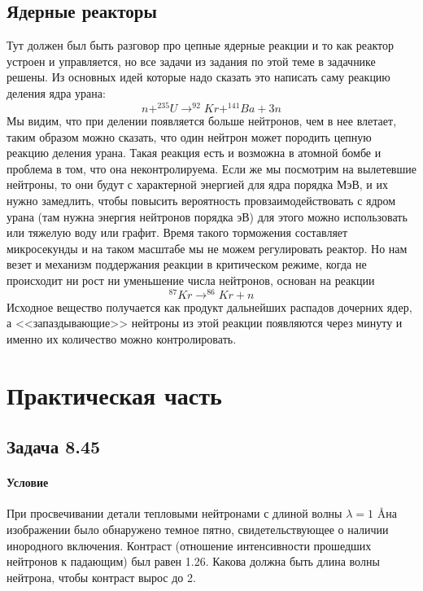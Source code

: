 \documentclass[12pt]{article}
\begin{document}
\subsection{Ядерные реакторы}
Тут должен был быть разговор про цепные ядерные реакции и то как реактор устроен и управляется, но все задачи из задания по этой теме в задачнике решены. Из основных идей которые надо сказать это написать саму реакцию деления ядра урана:
\begin{equation*}
    n + ^{235}U \rightarrow ^{92}Kr + ^{141}Ba + 3n
\end{equation*}
Мы видим, что при делении появляется больше нейтронов, чем в нее влетает, таким образом можно сказать, что один нейтрон может породить цепную реакцию деления урана. Такая реакция есть и возможна в атомной бомбе и проблема в том, что она неконтролируема. Если же мы посмотрим на вылетевшие нейтроны, то они будут с характерной энергией для ядра порядка МэВ, и их нужно замедлить, чтобы повысить вероятность провзаимодействовать с ядром урана (там нужна энергия нейтронов порядка эВ) для этого можно использовать или тяжелую воду или графит. Время такого торможения составляет микросекунды и на таком масштабе мы не можем регулировать реактор. Но нам везет и механизм поддержания реакции в критическом режиме, когда не происходит ни рост ни уменьшение числа нейтронов, основан на реакции 
\begin{equation*}
    ^{87}Kr \rightarrow ^{86}Kr + n
\end{equation*}
Исходное вещество получается как продукт дальнейших распадов дочерних ядер, а <<запаздывающие>> нейтроны из этой реакции появляются через минуту и именно их количество можно контролировать.

\section{Практическая часть}
\subsection{Задача 8.45}
\label{task_}
\paragraph{Условие}
При просвечивании детали тепловыми нейтронами с длиной волны $\lambda = 1$ \AA на изображении было обнаружено темное пятно, свидетельствующее о наличии инородного включения. Контраст (отношение интенсивности прошедших нейтронов к падающим) был равен 1.26. Какова должна быть длина волны нейтрона, чтобы контраст вырос до 2.
\end{document}
